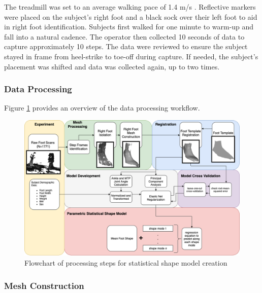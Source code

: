 \documentclass[defaultstyle,11pt]{comps}
\begin{document}
The treadmill was set to an average walking pace of 1.4 m/s \citep{Browning2006}.
Reflective markers were placed on the subject's right foot and a black sock over their left foot to aid in right foot identification.
Subjects first walked for one minute to warm-up and fall into a natural cadence.
The operator then collected 10 seconds of data to capture approximately 10 steps.
The data were reviewed to ensure the subject stayed in frame from heel-strike to toe-off during capture. If needed, the subject's placement was shifted and data was collected again, up to two times.

\hypertarget{data-processing}{%
\subsubsection{Data Processing}\label{data-processing}}

Figure \ref{fig:dataflow} provides an overview of the data processing workflow.

\begin{figure}
\hypertarget{fig:dataflow}{%
\centering
\includegraphics[width=1\textwidth,height=\textheight]{../fig/SA2/footProcessing.png}
\caption{Flowchart of processing steps for statistical shape model creation}\label{fig:dataflow}
}
\end{figure}

\hypertarget{mesh-construction}{%
\subsubsection{Mesh Construction}\label{mesh-construction}}
\end{document}
